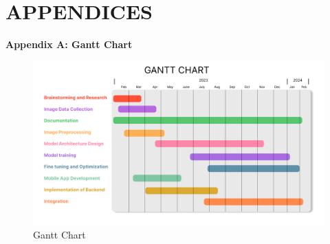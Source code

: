\section{APPENDICES}
\textbf{Appendix A: Gantt Chart }
\begin{figure}[h]
    \centering
    \includegraphics[width= 6.5in ]{img/Gantt Chart Improved.png}
    \caption{{Gantt Chart}}
\end{figure}